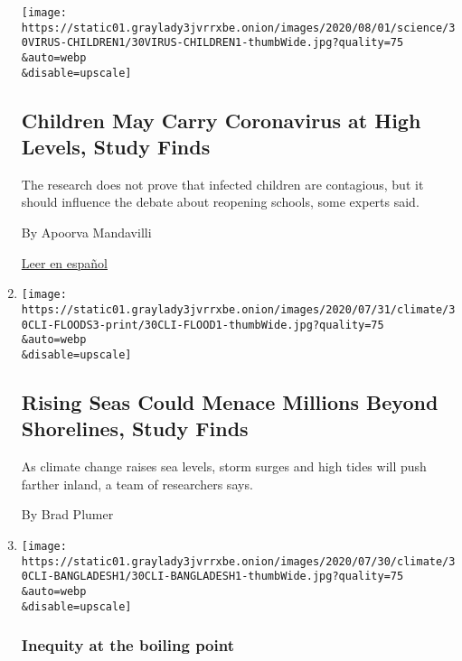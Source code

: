 \begin{enumerate}
  \texttt{[image: https://static01.graylady3jvrrxbe.onion/images/2020/08/01/science/30VIRUS-CHILDREN1/30VIRUS-CHILDREN1-thumbWide.jpg?quality=75\\\&auto=webp\\\&disable=upscale]}

  \hypertarget{children-may-carry-coronavirus-at-high-levels-study-finds}{%
  \subsection{Children May Carry Coronavirus at High Levels, Study
  Finds}\label{children-may-carry-coronavirus-at-high-levels-study-finds}}

  The research does not prove that infected children are contagious, but
  it should influence the debate about reopening schools, some experts
  said.

  By Apoorva Mandavilli

  \href{https://www.nytimes3xbfgragh.onion/es/2020/07/31/espanol/ciencia-y-tecnologia/ninos-contagio-coronavirus.html}{Leer
  en español}
\item
  \href{/2020/07/30/climate/sea-level-inland-floods.html}{}

  \texttt{[image: https://static01.graylady3jvrrxbe.onion/images/2020/07/31/climate/30CLI-FLOODS3-print/30CLI-FLOOD1-thumbWide.jpg?quality=75\\\&auto=webp\\\&disable=upscale]}

  \hypertarget{rising-seas-could-menace-millions-beyond-shorelines-study-finds}{%
  \subsection{Rising Seas Could Menace Millions Beyond Shorelines, Study
  Finds}\label{rising-seas-could-menace-millions-beyond-shorelines-study-finds}}

  As climate change raises sea levels, storm surges and high tides will
  push farther inland, a team of researchers says.

  By Brad Plumer
\item
  \href{/2020/07/30/climate/bangladesh-floods.html}{}

  \texttt{[image: https://static01.graylady3jvrrxbe.onion/images/2020/07/30/climate/30CLI-BANGLADESH1/30CLI-BANGLADESH1-thumbWide.jpg?quality=75\\\&auto=webp\\\&disable=upscale]}

  \hypertarget{inequity-at-the-boiling-point}{%
  \subsubsection{Inequity at the boiling
  point}\label{inequity-at-the-boiling-point}}


\end{enumerate}
